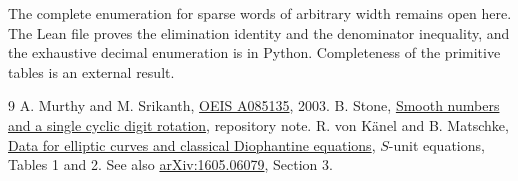 \documentclass[11pt,letterpaper]{article}
\begin{document}
The complete enumeration for sparse words of arbitrary width remains open here. The Lean file proves the elimination identity and the denominator inequality, and the exhaustive decimal enumeration is in Python. Completeness of the primitive tables is an external result.

\begin{thebibliography}{9}\small
{} A. Murthy and M. Srikanth, \href{https://oeis.org/A085135}{OEIS A085135}, 2003.
 B. Stone, \href{https://github.com/blakestone-x/math/tree/main/A085135}{Smooth numbers and a single cyclic digit rotation}, repository note.
 R. von K\"anel and B. Matschke, \href{https://bmatschke.github.io/solving-classical-diophantine-equations/}{Data for elliptic curves and classical Diophantine equations}, $S$-unit equations, Tables 1 and 2. See also \href{https://arxiv.org/abs/1605.06079}{arXiv:1605.06079}, Section 3.
\end{thebibliography}
\end{document}
